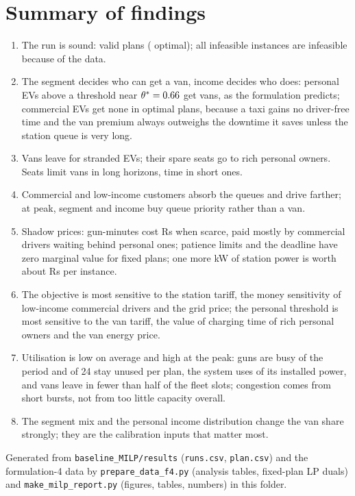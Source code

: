 \section{Summary of findings}
\begin{enumerate}[itemsep=2pt]
  \item The run is sound: \NValid{} valid plans (\NOpt{} optimal); all \NInf{} infeasible instances are infeasible because of the data.
  \item The segment decides who can get a van, income decides who does: personal EVs above a threshold near $\theta^{*}=0.66$ get vans, as the formulation predicts; commercial EVs get none in optimal plans, because a taxi gains no driver-free time and the van premium always outweighs the downtime it saves unless the station queue is very long.
  \item Vans leave for stranded EVs; their spare seats go to rich personal owners. Seats limit vans in long horizons, time in short ones.
  \item Commercial and low-income customers absorb the queues and drive farther; at peak, segment and income buy queue priority rather than a van.
  \item Shadow prices: gun-minutes cost \GunMean{} Rs when scarce, paid mostly by commercial drivers waiting behind personal ones; patience limits and the deadline have zero marginal value for fixed plans; one more kW of station power is worth about \DPFmean{} Rs per instance.
  \item The objective is most sensitive to the station tariff, the money sensitivity of low-income commercial drivers and the grid price; the personal threshold is most sensitive to the van tariff, the value of charging time of rich personal owners and the van energy price.
  \item Utilisation is low on average and high at the peak: guns are busy \UGunMean\pct{} of the period and \UIdleGunsMean{} of 24 stay unused per plan, the system uses \USystemMean\pct{} of its installed power, and vans leave in fewer than half of the fleet slots; congestion comes from short bursts, not from too little capacity overall.
  \item The segment mix and the personal income distribution change the van share strongly; they are the calibration inputs that matter most.
\end{enumerate}

{\small Generated from \texttt{baseline\_MILP/results} (\texttt{runs.csv}, \texttt{plan.csv}) and the formulation-4 data by \texttt{prepare\_data\_f4.py} (analysis tables, fixed-plan LP duals) and \texttt{make\_milp\_report.py} (figures, tables, numbers) in this folder.}


